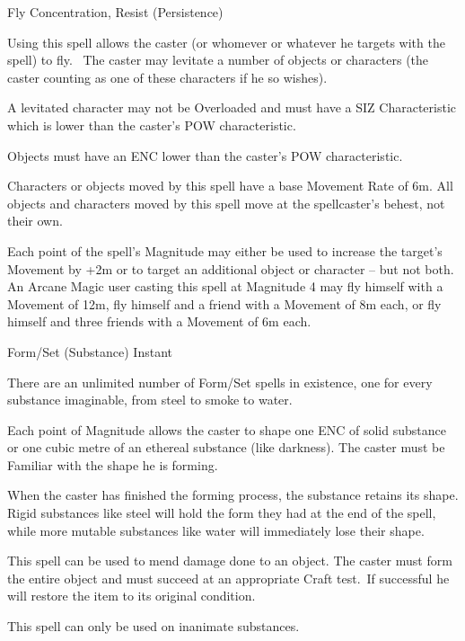 \begin{rpg-spell}
{Fly}
{Concentration, Resist (Persistence)}

Using this spell allows the caster (or whomever or whatever he targets with the spell) to fly.  The caster may levitate a number of objects or characters (the caster counting as one of these characters if he so wishes). 

A levitated character may not be Overloaded and must have a SIZ Characteristic which is lower than the caster’s POW characteristic. 

Objects must have an ENC lower than the caster’s POW characteristic. 

Characters or objects moved by this spell have a base Movement Rate of 6m. All objects and characters moved by this spell move at the spellcaster’s behest, not their own. 

Each point of the spell’s Magnitude may either be used to increase the target’s Movement by +2m or to target an additional object or character – but not both. An Arcane Magic user casting this spell at Magnitude 4 may fly himself with a Movement of 12m, fly himself and a friend with a Movement of 8m each, or fly himself and three friends with a Movement of 6m each.
\end{rpg-spell}


\begin{rpg-spell}
{Form/Set (Substance)}
{Instant}

There are an unlimited number of Form/Set spells in existence, one for every substance imaginable, from steel to smoke to water. 

Each point of Magnitude allows the caster to shape one ENC of solid substance or one cubic metre of an ethereal substance (like darkness). The caster must be Familiar with the shape he is forming. 

When the caster has finished the forming process, the substance retains its shape. Rigid substances like steel will hold the form they had at the end of the spell, while more mutable substances like water will immediately lose their shape. 

This spell can be used to mend damage done to an object. The caster must form the entire object and must succeed at an appropriate Craft test. If successful he will restore the item to its original condition. 

This spell can only be used on inanimate substances. 
\end{rpg-spell}



